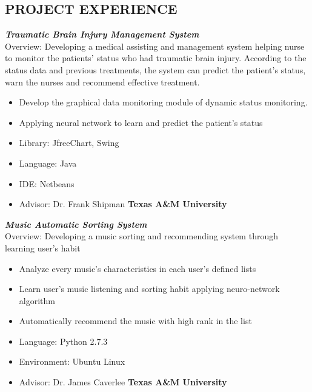 \documentclass[margin]{res}
\begin{document}
\begin{resume}
\section{PROJECT EXPERIENCE}		
	{\sl \textbf{Traumatic Brain Injury Management System}}\\
		Overview: Developing a medical assisting and management system helping nurse to monitor the patients' status who had traumatic brain injury. According to the status data and previous treatments, the system can predict the patient's status, warn the nurses and recommend effective treatment.
		\begin{itemize}
			\item Develop the graphical data monitoring module of dynamic status monitoring.
			\item Applying neural network to learn and predict the patient's status
			\item Library: JfreeChart, Swing
			\item Language: Java
			\item IDE: Netbeans
			\item Advisor: Dr. Frank Shipman \hfill \textbf{Texas A\&M University} 
		\end {itemize}

	{\sl \textbf{Music Automatic Sorting System}}\\
		Overview: Developing a music sorting and recommending system through learning user's habit 
		\begin{itemize}
			\item Analyze every music's characteristics in each user's defined lists			
			\item Learn user's music listening and sorting habit applying neuro-network algorithm		
			\item Automatically recommend the music with high rank in the list
			\item Language: Python 2.7.3
			\item Environment: Ubuntu Linux
			\item Advisor: Dr. James Caverlee \hfill \textbf{Texas A\&M University}
		\end {itemize}	
	

\end{resume}
\end{document}

